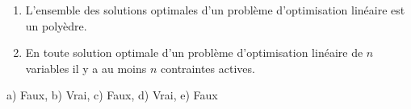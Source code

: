 \begin{enumerate}
\begin{enumerate}



      \item L'ensemble des solutions optimales d'un problème d'optimisation linéaire est un polyèdre.





      \item En toute solution optimale d'un problème d'optimisation linéaire de
        $n$ variables il y a au moins $n$  contraintes actives.













    \end{enumerate}

    \begin{solution}
      a) Faux, b) Vrai, c) Faux, d) Vrai, e) Faux
    \end{solution}

\end{enumerate}
